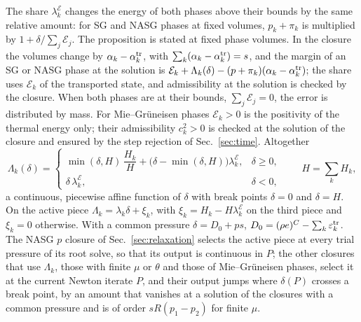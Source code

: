 The share $\lambda^{\mathcal E}_k$ changes the energy of both phases above their bounds by the same relative amount: for SG and NASG phases at
fixed volumes, $p_k+\pi_k$ is multiplied by $1+\delta/\sum_j\mathcal E_j$.
The proposition is stated at fixed phase volumes. In the closure the volumes change by $\alpha_k-\alpha^{\rm tr}_k$, with
$\sum_k(\alpha_k-\alpha^{\rm tr}_k)=s$, and the margin of an SG or NASG phase at the solution is
$\mathcal E_k+\Lambda_k(\delta)-(p+\pi_k)(\alpha_k-\alpha^{\rm tr}_k)$; the share uses $\mathcal E_k$ of the transported state, and
admissibility at the solution is checked by the closure. When both
phases are at their bounds, $\sum_j\mathcal E_j=0$, the error is distributed by mass. For Mie--Gr\"uneisen phases
$\mathcal E_k>0$ is the positivity of the thermal energy only; their admissibility $c_k^2>0$ is checked at the solution of the
closure and ensured by the step rejection of Sec.~\ref{sec:time}. Altogether
\begin{equation}
\Lambda_k(\delta)=\begin{cases}\min(\delta,H)\,\dfrac{H_k}{H}+\big(\delta-\min(\delta,H)\big)\lambda^{\mathcal E}_k,&\delta\ge0,\\[4pt]
\delta\,\lambda^{\mathcal E}_k,&\delta<0,\end{cases}\qquad H=\sum_kH_k ,
\label{eq:Lambda}
\end{equation}
a continuous, piecewise affine function of $\delta$ with break points $\delta=0$ and $\delta=H$. On the active piece
$\Lambda_k=\lambda_k\delta+\xi_k$, with $\xi_k=H_k-H\lambda^{\mathcal E}_k$ on the third piece and $\xi_k=0$ otherwise. With a common pressure
$\delta=D_0+ps$, $D_0=(\rho e)^C-\sum_k\varepsilon^{\rm tr}_k$. The NASG $p$ closure of Sec.~\ref{sec:relaxation} selects the active piece at every trial pressure of its
root solve, so that its output is continuous in $P$; the other closures that use $\Lambda_k$, those
with finite $\mu$ or $\theta$ and those of Mie--Gr\"uneisen phases, select it at the current Newton iterate $P$, and their output
jumps where $\delta(P)$ crosses a break point, by an amount that vanishes at a solution of the closures with a common pressure
and is of order $sR(p_1-p_2)$ for finite $\mu$.

